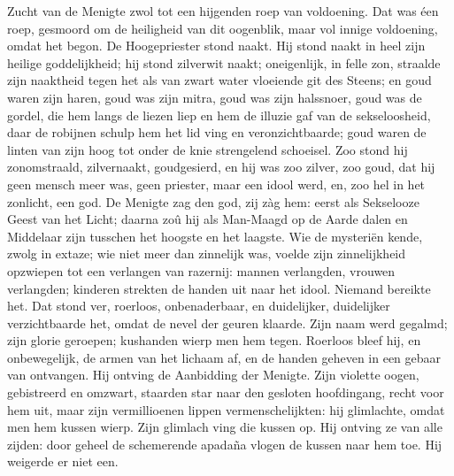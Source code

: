 \documentclass[a4paper, 12pt, oneside, dutch]{article}
\begin{document}
Zucht van de Menigte zwol tot een hijgenden roep van voldoening. Dat was éen roep, gesmoord om de heiligheid van dit oogenblik, maar vol innige voldoening, omdat het begon. De Hoogepriester stond naakt. Hij stond naakt in heel zijn heilige goddelijkheid; hij stond zilverwit naakt; oneigenlijk, in felle zon, straalde zijn naaktheid tegen het als van zwart water vloeiende git des Steens; en goud waren zijn haren, goud was zijn mitra, goud was zijn halssnoer, goud was de gordel, die hem langs de liezen liep en hem de illuzie gaf van de sekseloosheid, daar de robijnen schulp hem het lid ving en veronzichtbaarde; goud waren de linten van zijn hoog tot onder de knie strengelend schoeisel. Zoo stond hij zonomstraald, zilvernaakt, goudgesierd, en hij was zoo zilver, zoo goud, dat hij geen mensch meer was, geen priester, maar een idool werd, en, zoo hel in het zonlicht, een god. De Menigte zag den god, zij zàg hem: eerst als Sekselooze Geest van het Licht; daarna zoû hij als Man-Maagd op de Aarde dalen en Middelaar zijn tusschen het hoogste en het laagste. Wie de mysteriën kende, zwolg in extaze; wie niet meer dan zinnelijk was, voelde zijn zinnelijkheid opzwiepen tot een verlangen van razernij: mannen verlangden, vrouwen verlangden; kinderen strekten de handen uit naar het idool. Niemand bereikte het. Dat stond ver, roerloos, onbenaderbaar, en duidelijker, duidelijker verzichtbaarde het, omdat de nevel der geuren klaarde. Zijn naam werd gegalmd; zijn glorie geroepen; kushanden wierp men hem tegen. Roerloos bleef hij, en onbewegelijk, de armen van het lichaam af, en de handen geheven in een gebaar van ontvangen. Hij ontving de Aanbidding der Menigte. Zijn violette oogen, gebistreerd en omzwart, staarden star naar den gesloten hoofdingang, recht voor hem uit, maar zijn vermillioenen lippen vermenschelijkten: hij glimlachte, omdat men hem kussen wierp. Zijn glimlach ving die kussen op. Hij ontving ze van alle zijden: door geheel de schemerende apadaña vlogen de kussen naar hem toe. Hij weigerde er niet een.
\end{document}
